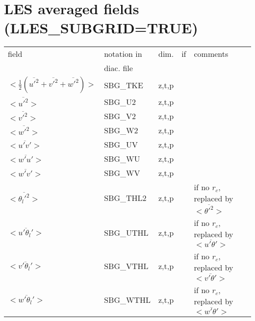 \section{LES averaged fields (LLES\_SUBGRID=TRUE)}

\begin{center}
\begin{tabular}{||p{6cm}|>{\centering}p{2.5cm}|>{\centering}p{1.5cm}|>{\centering}p{0.5cm}|p{5cm }||}
\hline
\hline
field & notation in & dim. &   if  & comments \\
      & diac. file &           &  & \\
\hline
\hline
$<\frac{1}{2}(\overline{u'^2}+\overline{v'^2}+\overline{w'^2})>$ & SBG\_TKE &z,t,p &   & \\
\hline
$<\overline{u'^2}>$ & SBG\_U2 &z,t,p &   & \\
\hline
$<\overline{v'^2}>$ & SBG\_V2 &z,t,p &   & \\
\hline
$<\overline{w'^2}>$ & SBG\_W2 &z,t,p &   & \\
\hline
$<\overline{u'v'}>$ & SBG\_UV &z,t,p &   & \\
\hline
$<\overline{w'u'}>$ & SBG\_WU &z,t,p &   & \\
\hline
$<\overline{w'v'}>$ & SBG\_WV &z,t,p &   & \\
\hline
$<\overline{\theta_l'^2}>$ & SBG\_THL2 &z,t,p &   & if no $r_c$, replaced by $<\overline{\theta'^2}>$\\
\hline
$<\overline{u'\theta_l'}>$ & SBG\_UTHL &z,t,p &   & if no $r_c$, replaced by $<\overline{u'\theta'}>$ \\
\hline
$<\overline{v'\theta_l'}>$ & SBG\_VTHL &z,t,p &   & if no $r_c$, replaced by $<\overline{v'\theta'}>$ \\
\hline
$<\overline{w'\theta_l'}>$ & SBG\_WTHL &z,t,p &   & if no $r_c$, replaced by $<\overline{w'\theta'}>$ \\
\hline
\hline
\end{tabular}
\end{center}

